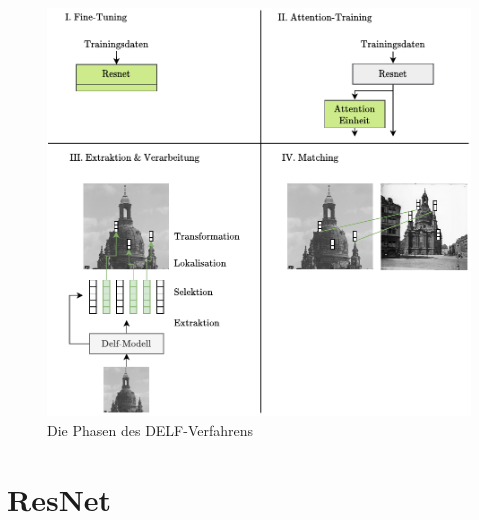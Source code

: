 \begin{figure}[H]
\centering
\includegraphics[scale=0.95]{delf_stages.pdf}
\caption{Die Phasen des DELF-Verfahrens}
\label{delf_stages}
\end{figure}

\section{ResNet}

